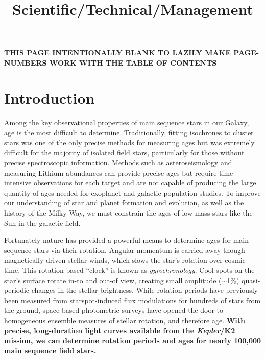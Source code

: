 \documentclass[12pt]{article}
\newcommand{\Kepler}{\textsl{Kepler}\xspace}
\begin{document}

{\bf THIS PAGE INTENTIONALLY BLANK TO LAZILY MAKE PAGE-NUMBERS WORK WITH THE TABLE OF CONTENTS}
\clearpage


\title{\vspace{-0.5in}Scientific/Technical/Management}
\date{}

\maketitle


\vspace{-1in}

\section{Introduction}



Among the key observational properties of main sequence stars in our Galaxy,
age is the most difficult to determine.
Traditionally, fitting isochrones to cluster stars was one of the only precise
methods for measuring ages but was extremely difficult for the majority of
isolated field stars, particularly for those without precise spectroscopic
information.
Methods such as asteroseismology and measuring Lithium abundances can provide
precise ages but require time intensive observations for each target and are
not capable of producing the large quantity of ages needed for exoplanet and
galactic population studies.
To improve our understanding of star and planet formation and evolution, as
well as the history of the Milky Way, we must constrain the ages of
low-mass stars like the Sun in the galactic field.

Fortunately nature has provided a powerful means to determine ages for main
sequence stars via their rotation.
Angular momentum is carried away though magnetically driven stellar winds,
which slows the star's rotation over cosmic time.
This rotation-based ``clock'' is known as {\it gyrochronology}.
Cool spots on the star's surface rotate in-to and out-of view, creating small
amplitude ($\sim$1\%) quasi-periodic changes in the stellar brightness.
While rotation periods have previously been %
measured from
starspot-induced flux modulations for hundreds of stars from the ground,
space-based photometric surveys have opened the door to homogeneous ensemble
measures of stellar rotation, and therefore age.
{\bf With precise, long-duration light curves available from the \Kepler/K2
mission, we can determine rotation periods and ages for nearly 100,000
main sequence field stars.}
\end{document}
